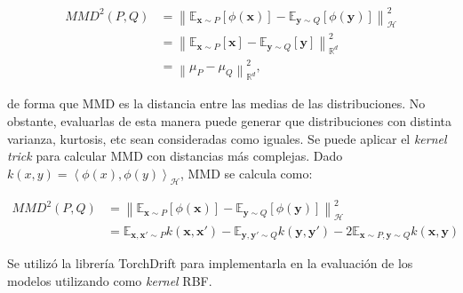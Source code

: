 \begin{align}
    MMD^2(P, Q) & = \left\lVert \mathbb{E}_{\mathbf{x} \sim P}[\phi(\mathbf{x})] - \mathbb{E}_{\mathbf{y} \sim Q}[\phi(\mathbf{y})] \right\rVert_{\mathcal{H}}^2 \nonumber \\
                & = \left\lVert \mathbb{E}_{\mathbf{x} \sim P}[\mathbf{x}] - \mathbb{E}_{\mathbf{y} \sim Q}[\mathbf{y}] \right\rVert_{\mathbb{R}^d}^2            \nonumber \\
                & = \left\lVert \mu_{P} - \mu_{Q} \right\rVert_{\mathbb{R}^d}^2,
    \label{eq:mmd-identidad}
\end{align}

\noindent
de forma que MMD es la distancia entre las medias de las distribuciones. No obstante, evaluarlas de esta manera puede
generar que distribuciones con distinta varianza, kurtosis, etc sean consideradas como iguales. Se puede aplicar el
    {\it kernel trick} para calcular MMD con distancias más complejas. Dado $k(x, y) = \left\langle \phi(x), \phi(y)
    \right\rangle_{\mathcal{H}} $, MMD se calcula como:

\begin{align}
    MMD^2(P, Q) & = \left\lVert \mathbb{E}_{\mathbf{x} \sim P}[\phi(\mathbf{x})] - \mathbb{E}_{\mathbf{y} \sim Q}[\phi(\mathbf{y})] \right\rVert_{\mathcal{H}}^2 \nonumber                                                                          \\
                & = \mathbb{E}_{\mathbf{x}, \mathbf{x'} \sim P} k(\mathbf{x}, \mathbf{x'}) - \mathbb{E}_{\mathbf{y}, \mathbf{y'} \sim Q} k(\mathbf{y}, \mathbf{y'}) - 2 \mathbb{E}_{\mathbf{x} \sim P, \mathbf{y} \sim Q} k(\mathbf{x}, \mathbf{y})
    \label{eq:mmd-kernel}
\end{align}

\noindent
Se utilizó la librería TorchDrift \parencite{torchdrift} para implementarla en la evaluación de los modelos utilizando como {\it kernel} RBF.